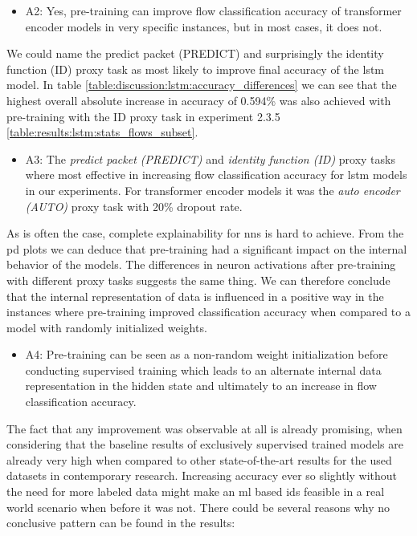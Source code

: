 \begin{itemize}
	\item A2: Yes, pre-training can improve flow classification accuracy of transformer encoder models in very specific instances, but in most cases, it does not.
\end{itemize}

We could name the predict packet (PREDICT) and surprisingly the identity function (ID) proxy task as most likely to improve final accuracy of the \gls{lstm} model. In table \ref{table:discussion:lstm:accuracy_differences} we can see that the highest overall absolute increase in accuracy of 0.594\% was also achieved with pre-training with the ID proxy task in experiment 2.3.5 \ref{table:results:lstm:stats_flows_subset}. \par

\begin{itemize}
	\item A3: The \textit{predict packet (PREDICT)} and \textit{identity function (ID)} proxy tasks where most effective in increasing flow classification accuracy for \gls{lstm} models in our experiments. For transformer encoder models it was the \textit{auto encoder (AUTO)} proxy task with 20\% dropout rate.
\end{itemize}

As is often the case, complete explainability for \glspl{nn} is hard to achieve. From the \gls{pd} plots we can deduce that pre-training had a significant impact on the internal behavior of the models. The differences in neuron activations after pre-training with different proxy tasks suggests the same thing. We can therefore conclude that the internal representation of data is influenced in a positive way in the instances where pre-training improved classification accuracy when compared to a model with randomly initialized weights.

\begin{itemize}
	\item A4: Pre-training can be seen as a non-random weight initialization before conducting supervised training which leads to an alternate internal data representation in the hidden state and ultimately to an increase in flow classification accuracy.
\end{itemize}

The fact that any improvement was observable at all is already promising, when considering that the baseline results of exclusively supervised trained models are already very high when compared to other state-of-the-art results for the used datasets in contemporary research. Increasing accuracy ever so slightly without the need for more labeled data might make an \gls{ml} based \gls{ids} feasible in a real world scenario when before it was not. There could be several reasons why no conclusive pattern can be found in the results: \par

